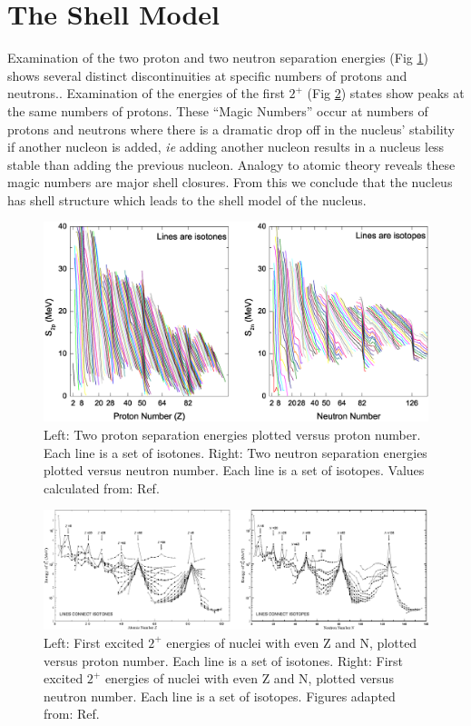 \section{The Shell Model}
\label{sec:models-shell-model}
Examination of the two proton and two neutron separation energies (Fig \ref{fig:chp2-masses}) shows several distinct discontinuities at specific numbers of protons and neutrons.. Examination of the energies of the first $2^+$ (Fig \ref{fig:chp2-two-plus-energies}) states show peaks at the same numbers of protons. These ``Magic Numbers'' occur at numbers of protons and neutrons where there is a dramatic drop off in the nucleus' stability if another nucleon is added, \emph{ie} adding another nucleon results in a nucleus less stable than adding the previous nucleon. Analogy to atomic theory reveals these magic numbers are major shell closures. From this we conclude that the nucleus has shell structure which leads to the shell model of the nucleus.

\begin{figure}
\label{fig:chp2-masses}
\centerline{\includegraphics[width=\textwidth]{./img/c2/2nuc_sep_en.eps}}
	\caption{Left: Two proton separation energies plotted versus proton number. Each line is a set of isotones. Right: Two neutron separation energies plotted versus neutron number. Each line is a set of isotopes. Values calculated from: Ref.\cite{AME20031,AME20032}}
\end{figure}

\begin{figure}
\label{fig:chp2-two-plus-energies}
\centerline{\includegraphics[width=\textwidth]{./img/c2/2_plus_en.eps}}
	\caption{Left: First excited $2^+$ energies of nuclei with even Z and N, plotted versus proton number. Each line is a set of isotones. Right: First excited $2^+$ energies of nuclei with even Z and N, plotted versus neutron number. Each line is a set of isotopes. Figures adapted from: Ref.\cite{RamanTwoPlus}}
\end{figure}

